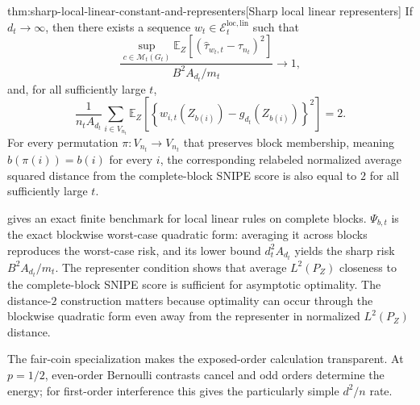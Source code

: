 \begin{theoremv}{thm:sharp-local-linear-constant-and-representers}[Sharp local linear representers]
If \(d_t\to\infty\), then there exists a sequence \(w_t\in\mathcal E_t^{\mathrm{loc,lin}}\) such that
\[
\frac{
\sup_{c\in\mathcal M_t(G_t)}
\mathbb E_Z\!\left[(\widehat\tau_{w_t,t}-\tau_{n_t})^2\right]
}{
B^2A_{d_t}/m_t
}
\longrightarrow 1,
\]
and, for all sufficiently large \(t\),
\[
\frac{1}{n_tA_{d_t}}
\sum_{i\in V_{n_t}}
\mathbb E_Z\!\left[
\left\{
w_{i,t}(Z_{b(i)})-g_{d_t}(Z_{b(i)})
\right\}^2
\right]
=2.
\]
For every permutation \(\pi:V_{n_t}\to V_{n_t}\) that preserves block membership, meaning \(b(\pi(i))=b(i)\) for every \(i\), the corresponding relabeled normalized average squared distance from the complete-block SNIPE score is also equal to \(2\) for all sufficiently large \(t\).
\end{theoremv}

 gives an exact finite benchmark for local linear rules on complete blocks. \(\Psi_{b,t}\) is the exact blockwise worst-case quadratic form: averaging it across blocks reproduces the worst-case risk, and its lower bound \(d_t^2A_{d_t}\) yields the sharp risk \(B^2A_{d_t}/m_t\). The representer condition shows that average \(L^2(P_Z)\) closeness to the complete-block SNIPE score is sufficient for asymptotic optimality. The distance-\(2\) construction matters because optimality can occur through the blockwise quadratic form even away from the representer in normalized \(L^2(P_Z)\) distance.

The fair-coin specialization makes the exposed-order calculation transparent. At \(p=1/2\), even-order Bernoulli contrasts cancel and odd orders determine the energy; for first-order interference this gives the particularly simple \(d^2/n\) rate.

